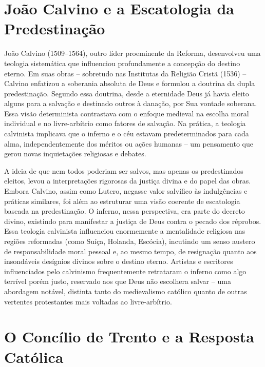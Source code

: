 \section{João Calvino e a Escatologia da Predestinação}

João Calvino (1509--1564), outro líder proeminente da Reforma, desenvolveu uma teologia sistemática que influenciou profundamente a concepção do destino eterno. Em suas obras -- sobretudo nas Institutas da Religião Cristã (1536) -- Calvino enfatizou a soberania absoluta de Deus e formulou a doutrina da dupla predestinação. Segundo essa doutrina, desde a eternidade Deus já havia eleito alguns para a salvação e destinado outros à danação, por Sua vontade soberana. Essa visão determinista contrastava com o enfoque medieval na escolha moral individual e no livre-arbítrio como fatores de salvação. Na prática, a teologia calvinista implicava que o inferno e o céu estavam predeterminados para cada alma, independentemente dos méritos ou ações humanas -- um pensamento que gerou novas inquietações religiosas e debates.

A ideia de que nem todos poderiam ser salvos, mas apenas os predestinados eleitos, levou a interpretações rigorosas da justiça divina e do papel das obras. Embora Calvino, assim como Lutero, negasse valor salvífico às indulgências e práticas similares, foi além ao estruturar uma visão coerente de escatologia baseada na predestinação. O inferno, nessa perspectiva, era parte do decreto divino, existindo para manifestar a justiça de Deus contra o pecado dos réprobos. Essa teologia calvinista influenciou enormemente a mentalidade religiosa nas regiões reformadas (como Suíça, Holanda, Escócia), incutindo um senso austero de responsabilidade moral pessoal e, ao mesmo tempo, de resignação quanto aos insondáveis desígnios divinos sobre o destino eterno. Artistas e escritores influenciados pelo calvinismo frequentemente retrataram o inferno como algo terrível porém justo, reservado aos que Deus não escolhera salvar -- uma abordagem notável, distinta tanto do medievalismo católico quanto de outras vertentes protestantes mais voltadas ao livre-arbítrio.

\section{O Concílio de Trento e a Resposta Católica}

